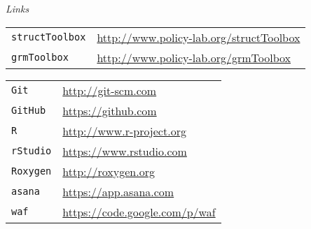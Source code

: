 \begin{frame}\begin{center}
\LARGE\textit{Links}
\end{center}\end{frame}
\begin{frame}[fragile] 
 
\center\begin{tabular}{ll}
\verb+structToolbox+    & \url{http://www.policy-lab.org/structToolbox}\\ [1ex]
\verb+grmToolbox+       & \url{http://www.policy-lab.org/grmToolbox}\\ [1ex]
\end{tabular}

\end{frame}
\begin{frame}[fragile] 

\center\begin{tabular}{ll} 
\verb+Git+ &\url{http://git-scm.com}\\ [1ex]
\verb+GitHub+ &\url{https://github.com}\\ [1ex]
\verb+R+ &\url{http://www.r-project.org}\\ [1ex]
\verb+rStudio+ &\url{https://www.rstudio.com}\\ [1ex]
\verb+Roxygen+ &\url{http://roxygen.org}\\ [1ex]
\verb+asana+ &\url{https://app.asana.com}\\ [1ex]
\verb+waf+ &\url{https://code.google.com/p/waf}\\ [1ex]
\end{tabular}

\end{frame}

